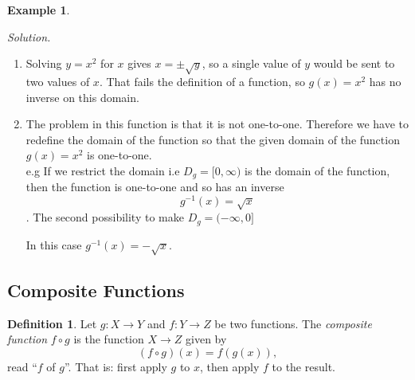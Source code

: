 \documentclass[11pt,a4paper]{article}
\theoremstyle{definition}
\newtheorem{definition}[thm]{Definition}
\newtheorem{example}[thm]{Example}
\begin{document}
\begin{example}
\begin{enumerate}
\emph{Solution.}
\begin{enumerate}
       \item Solving $y=x^{2}$ for $x$ gives $x=\pm\sqrt{y}$, so a single value
of $y$ would be sent to two values of $x$. That fails the definition of a
function, so $g(x)=x^{2}$ has no inverse on this domain.
       \item The problem in this function is that it is not one-to-one. Therefore we have to redefine the domain of the function so that the given domain of the function $g(x)=x^2$ is one-to-one.\\
e.g If we restrict the domain i.e $D_g=[0,\infty)$ is the domain of the function, then the function is one-to-one and so has an inverse $$g^{-1}(x)=\sqrt{x}$$.
The second possibility to make $D_g=(-\infty,0]$

\begin{figure}[H]
\centering
{}
\end{figure}

In this case $g^{-1}(x)=-\sqrt{x}$.\\
\end{enumerate}
\end{enumerate}
\end{example}
\subsection{Composite Functions}
\begin{definition}
Let $g:X\longrightarrow Y$ and $f:Y\longrightarrow Z$ be two functions. The
\emph{composite function} $f\circ g$ is the function $X\longrightarrow Z$ given by
$$(f\circ g)(x)=f\left(g(x)\right),$$
read ``$f$ of $g$''. That is: first apply $g$ to $x$, then apply $f$ to the result.
\end{definition}
\end{document}
